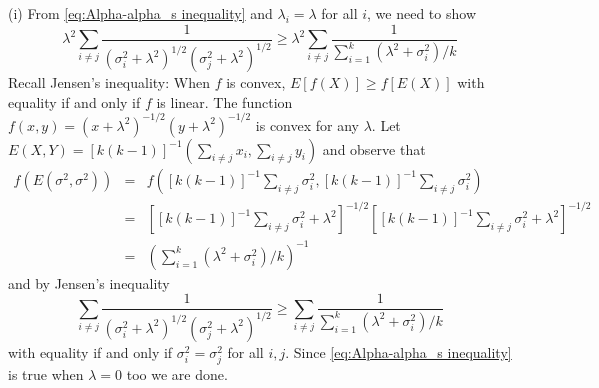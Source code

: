 \documentclass{article}
\makeatletter
\theoremstyle{plain}
\theoremstyle{plain}
\theoremstyle{definition}
\theoremstyle{remark}
\theoremstyle{definition}
\theoremstyle{plain}
\theoremstyle{plain}
\theoremstyle{definition}
\newenvironment{proof}[1][\protect\proofname]{\par
	\normalfont\topsep6\p@\@plus6\p@\relax
	\trivlist
	\itemindent\parindent
	\item[\hskip\labelsep\scshape #1]\ignorespaces
}{%
	\endtrivlist\@endpefalse
}
\providecommand{\proofname}{Proof}
\renewcommand{\sqrt}[1]{{(#1)^{1/2}}}
\makeatother
\begin{document}
\begin{proof}[Proof of Proposition \ref{prop:Reliabilities.}]\label{proof:Reliabilities.}
(i) From \eqref{eq:Alpha-alpha_s inequality} and $\lambda_{i}=\lambda$
for all $i$, we need to show
\[
\lambda^{2}\sum_{i\neq j}\frac{1}{\sqrt{\sigma_{i}^{2}+\lambda^{2}}\sqrt{\sigma_{j}^{2}+\lambda^{2}}}\geq\lambda^{2}\sum_{i\neq j}\frac{1}{\sum_{i=1}^{k}\left(\lambda^{2}+\sigma_{i}^{2}\right)/k}
\]
Recall Jensen's inequality: When $f$ is convex, $E\left[f\left(X\right)\right]\geq f\left[E\left(X\right)\right]$ with equality if and only if $f$ is linear.
The function $f\left(x,y\right)=\left(x+\lambda^{2}\right)^{-1/2}\left(y+\lambda^{2}\right)^{-1/2}$
is convex for any $\lambda$. Let $E\left(X,Y\right)=\left[k\left(k-1\right)\right]^{-1}\left(\sum_{i\neq j}x_{i},\sum_{i\neq j}y_{i}\right)$
and observe that
\begin{eqnarray*}
f\left(E\left(\sigma^{2},\sigma^{2}\right)\right) & = & f\left(\left[k\left(k-1\right)\right]^{-1}\sum_{i\neq j}\sigma_{i}^{2},\left[k\left(k-1\right)\right]^{-1}\sum_{i\neq j}\sigma_{i}^{2}\right)\\
 & = & \left[\left[k\left(k-1\right)\right]^{-1}\sum_{i\neq j}\sigma_{i}^{2}+\lambda^{2}\right]^{-1/2}\left[\left[k\left(k-1\right)\right]^{-1}\sum_{i\neq j}\sigma_{i}^{2}+\lambda^{2}\right]^{-1/2}\\
 & = & \left(\sum_{i=1}^{k}\left(\lambda^{2}+\sigma_{i}^{2}\right)/k\right)^{-1}
\end{eqnarray*}
and by Jensen's inequality
\[
\sum_{i\neq j}\frac{1}{\sqrt{\sigma_{i}^{2}+\lambda^{2}}\sqrt{\sigma_{j}^{2}+\lambda^{2}}}\geq\sum_{i\neq j}\frac{1}{\sum_{i=1}^{k}\left(\lambda^{2}+\sigma_{i}^{2}\right)/k}
\]
with equality if and only if $\sigma_{i}^{2}=\sigma_{j}^{2}$ for
all $i,j$. Since \eqref{eq:Alpha-alpha_s inequality} is true when
$\lambda=0$ too we are done.


\end{proof}
\end{document}
